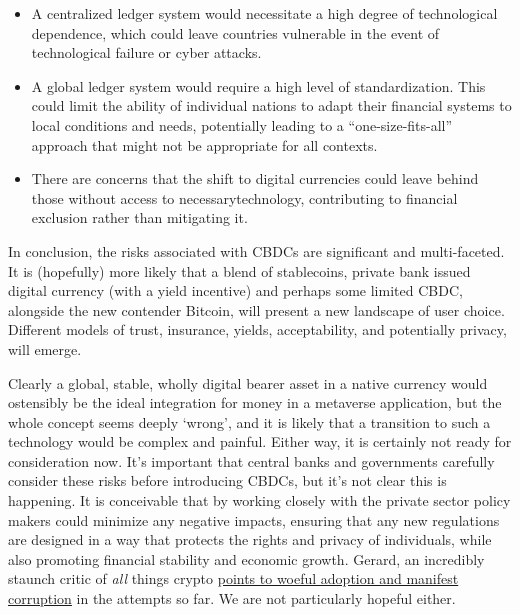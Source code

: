 \begin{itemize}
\begin{itemize}
\item A centralized ledger system would necessitate a high degree of technological dependence, which could leave countries vulnerable in the event of technological failure or cyber attacks.
\item A global ledger system would require a high level of standardization. This could limit the ability of individual nations to adapt their financial systems to local conditions and needs, potentially leading to a ``one-size-fits-all'' approach that might not be appropriate for all contexts.
\item There are concerns that the shift to digital currencies could leave behind those without access to necessarytechnology, contributing to financial exclusion rather than mitigating it.
\end{itemize} 

In conclusion, the risks associated with CBDCs are significant and multi-faceted. It is (hopefully) more likely that a blend of stablecoins, private bank issued digital currency (with a yield incentive) and perhaps some limited CBDC, alongside the new contender Bitcoin, will present a new landscape of user choice. Different models of trust, insurance, yields, acceptability, and potentially privacy, will emerge. \par
Clearly a global, stable, wholly digital bearer asset in a native currency would ostensibly be the ideal integration for money in a metaverse application, but the whole concept seems deeply `wrong', and it is likely that a transition to such a technology would be complex and painful. Either way, it is certainly not ready for consideration now.
It's important that central banks and governments carefully consider these risks before introducing CBDCs, but it's not clear this is happening. It is conceivable that by working closely with the private sector policy makers could minimize any negative impacts, ensuring that any new regulations are designed in a way that protects the rights and privacy of individuals, while also promoting financial stability and economic growth. Gerard, an incredibly staunch critic of \textit{all} things crypto \href{https://davidgerard.co.uk/blockchain/2023/02/28/news-blockchain-mep-eva-kaili-corruption-arrest-nigerian-cbdc-rewrite-bbc-blockchain-misadventures/}{points to woeful adoption and manifest corruption} in the attempts so far. We are not particularly hopeful either.

\end{itemize}
